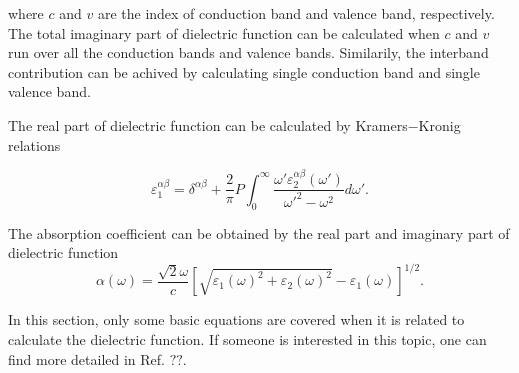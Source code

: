 \documentclass[a4paper, 12pt, titlepage,oneside,drop]{kthesis}
\begin{document}
where $c$ and $v$ are the index of conduction band and valence band, respectively. The total imaginary part of dielectric function can be calculated when $c$ and $v$ run over all the conduction bands and valence bands. Similarily, the
interband contribution can be achived by calculating single conduction band and single valence band.   

The real part of dielectric function can be calculated by Kramers$-$Kronig relations

\begin{equation}
 \varepsilon_1^{\alpha\beta} = \delta^{\alpha\beta}+\frac{2}{\pi}P\int^{\infty}_{0} \frac{\omega'\varepsilon_2^{\alpha\beta}(\omega')}{\omega'^{2}-\omega^{2}} d\omega'.
\end{equation}


The absorption coefficient can be obtained by the real part and imaginary part of dielectric function
\begin{equation}
 \alpha(\omega) = \frac{\sqrt{2}\omega}{c} \left[ \sqrt{{\varepsilon_1(\omega)}^2+{\varepsilon_2(\omega)}^2}-{\varepsilon_1(\omega)} \right]^{1/2}.
\end{equation}

In this section, only some basic equations are covered when it is related to calculate the dielectric function. If someone is interested in this topic, one can find more detailed in Ref. $??$.
\end{document}
